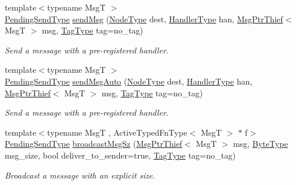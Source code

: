 \begin{DoxyCompactItemize}
{\footnotesize template$<$typename MsgT $>$ }\\\hyperlink{structvt_1_1messaging_1_1_active_messenger_a3626a6ca76d8ad4ec7c3b47a2c70d3a8}{Pending\+Send\+Type} \hyperlink{group__preregister_ga0162a39473e7f9b490a79a7983d949ac}{send\+Msg} (\hyperlink{namespacevt_a866da9d0efc19c0a1ce79e9e492f47e2}{Node\+Type} dest, \hyperlink{namespacevt_af64846b57dfcaf104da3ef6967917573}{Handler\+Type} han, \hyperlink{structvt_1_1messaging_1_1_msg_ptr_thief}{Msg\+Ptr\+Thief}$<$ MsgT $>$ msg, \hyperlink{namespacevt_a84ab281dae04a52a4b243d6bf62d0e52}{Tag\+Type} tag=no\+\_\+tag)
\begin{DoxyCompactList}\small\item\em Send a message with a pre-\/registered handler. \end{DoxyCompactList}\item 
{\footnotesize template$<$typename MsgT $>$ }\\\hyperlink{structvt_1_1messaging_1_1_active_messenger_a3626a6ca76d8ad4ec7c3b47a2c70d3a8}{Pending\+Send\+Type} \hyperlink{group__preregister_gad30a4e31445d40f9c3c36521fc04f975}{send\+Msg\+Auto} (\hyperlink{namespacevt_a866da9d0efc19c0a1ce79e9e492f47e2}{Node\+Type} dest, \hyperlink{namespacevt_af64846b57dfcaf104da3ef6967917573}{Handler\+Type} han, \hyperlink{structvt_1_1messaging_1_1_msg_ptr_thief}{Msg\+Ptr\+Thief}$<$ MsgT $>$ msg, \hyperlink{namespacevt_a84ab281dae04a52a4b243d6bf62d0e52}{Tag\+Type} tag=no\+\_\+tag)
\begin{DoxyCompactList}\small\item\em Send a message with a pre-\/registered handler. \end{DoxyCompactList}\item 
{\footnotesize template$<$typename MsgT , Active\+Typed\+Fn\+Type$<$ Msg\+T $>$ $\ast$ f$>$ }\\\hyperlink{structvt_1_1messaging_1_1_active_messenger_a3626a6ca76d8ad4ec7c3b47a2c70d3a8}{Pending\+Send\+Type} \hyperlink{group__typesafehan_ga9f860f0d5b630840ca164af25f74e9e9}{broadcast\+Msg\+Sz} (\hyperlink{structvt_1_1messaging_1_1_msg_ptr_thief}{Msg\+Ptr\+Thief}$<$ MsgT $>$ msg, \hyperlink{namespacevt_aab8d55968084610ce3b17057981e9300}{Byte\+Type} msg\+\_\+size, bool deliver\+\_\+to\+\_\+sender=true, \hyperlink{namespacevt_a84ab281dae04a52a4b243d6bf62d0e52}{Tag\+Type} tag=no\+\_\+tag)
\begin{DoxyCompactList}\small\item\em Broadcast a message with an explicit size. \end{DoxyCompactList}\item 

\end{DoxyCompactItemize}
